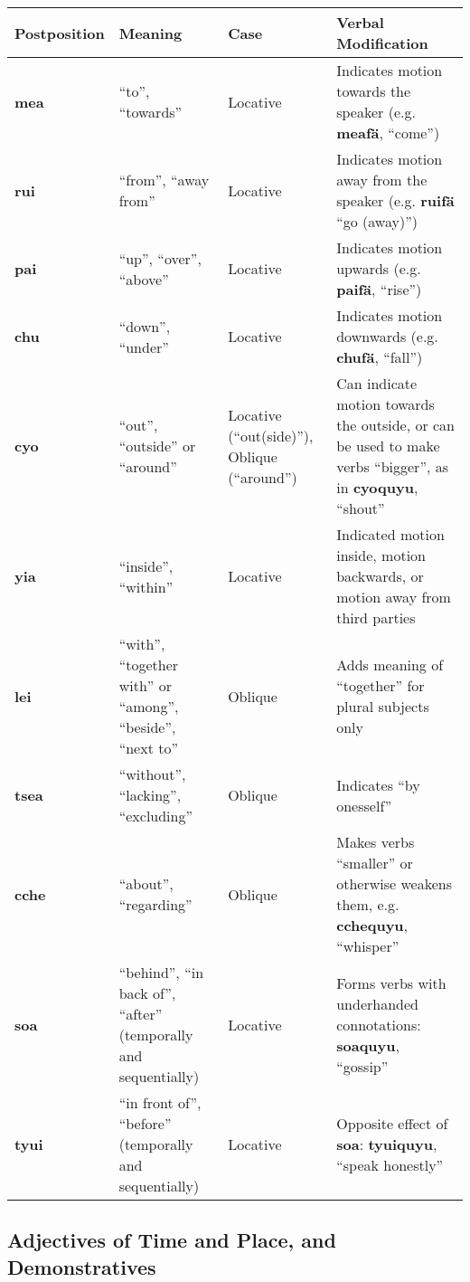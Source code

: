 \documentclass{article}
\begin{document}
\begin{table}[htb!]
\begin{tabular}{|l|p{1.5in}|p{1in}|p{2in}|}
\hline
Postposition & Meaning & Case & Verbal Modification \\ \hline
\textbf{mea} & ``to'', ``towards'' & Locative & Indicates motion towards the speaker (e.g. \textbf{meaf\"a}, ``come'') \\ \hline
\textbf{rui} & ``from'', ``away from'' & Locative & Indicates motion away from the speaker (e.g. \textbf{ruif\"a} ``go (away)'') \\ \hline
\textbf{pai} & ``up'', ``over'', ``above'' & Locative & Indicates motion upwards (e.g. \textbf{paif\"a}, ``rise'') \\ \hline
\textbf{chu} & ``down'', ``under'' & Locative & Indicates motion downwards (e.g. \textbf{chuf\"a}, ``fall'') \\ \hline
\textbf{cyo} & ``out'', ``outside'' or ``around'' & Locative (``out(side)''), Oblique (``around'') & Can indicate motion towards the outside, or can be used to make verbs ``bigger'', as in \textbf{cyoquyu}, ``shout'' \\ \hline
\textbf{yia} & ``inside'', ``within'' & Locative & Indicated motion inside, motion backwards, or motion away from third parties \\ \hline
\textbf{lei} & ``with'', ``together with'' or ``among'', ``beside'', ``next to'' & Oblique & Adds meaning of ``together'' for plural subjects only \\ \hline
\textbf{tsea} & ``without'', ``lacking'', ``excluding'' & Oblique & Indicates ``by onesself'' \\ \hline
\textbf{cche} & ``about'', ``regarding'' & Oblique & Makes verbs ``smaller'' or otherwise weakens them, e.g. \textbf{cchequyu}, ``whisper'' \\ \hline
\textbf{soa} & ``behind'', ``in back of'', ``after'' (temporally and sequentially) & Locative & Forms verbs with underhanded connotations: \textbf{soaquyu}, ``gossip'' \\ \hline
\textbf{tyui} & ``in front of'', ``before'' (temporally and sequentially) & Locative & Opposite effect of \textbf{soa}: \textbf{tyuiquyu}, ``speak honestly'' \\ \hline
\end{tabular}
\end{table}

\subsection{Adjectives of Time and Place, and Demonstratives}
\end{document}
